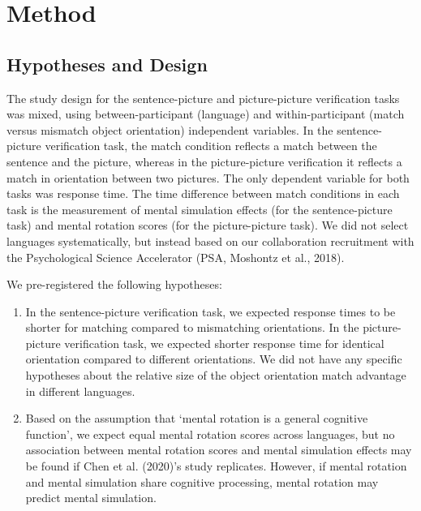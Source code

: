 \documentclass[
  man,floatsintext]{apa7}
\begin{document}
\hypertarget{method}{%
\section{Method}\label{method}}

\hypertarget{hypotheses-and-design}{%
\subsection{Hypotheses and Design}\label{hypotheses-and-design}}

The study design for the sentence-picture and picture-picture
verification tasks was mixed, using between-participant (language) and
within-participant (match versus mismatch object orientation)
independent variables. In the sentence-picture verification task, the
match condition reflects a match between the sentence and the picture,
whereas in the picture-picture verification it reflects a match in
orientation between two pictures. The only dependent variable for both
tasks was response time. The time difference between match conditions in
each task is the measurement of mental simulation effects (for the
sentence-picture task) and mental rotation scores (for the
picture-picture task). We did not select languages systematically, but
instead based on our collaboration recruitment with the Psychological
Science Accelerator (PSA, Moshontz et al., 2018).

We pre-registered the following hypotheses:

\begin{enumerate}
\def\labelenumi{(\arabic{enumi})}
\item
  In the sentence-picture verification task, we expected response
  times to be shorter for matching compared to mismatching
  orientations. In the picture-picture verification task, we expected
  shorter response time for identical orientation compared to
  different orientations. We did not have any specific hypotheses
  about the relative size of the object orientation match advantage in
  different languages.
\item
  Based on the assumption that `mental rotation is a general cognitive
  function', we expect equal mental rotation scores across languages,
  but no association between mental rotation scores and mental
  simulation effects may be found if Chen et al. (2020)'s study
  replicates. However, if mental rotation and mental simulation share
  cognitive processing, mental rotation may predict mental simulation.
\end{enumerate}
\end{document}
